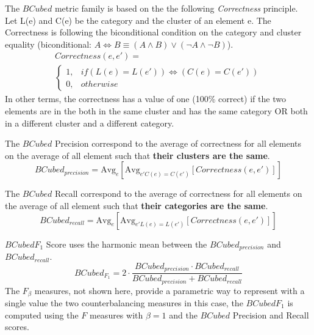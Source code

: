 \begin{definition}
  The $BCubed$ metric family is based on the the following \textit{Correctness} principle.
  Let L(e) and C(e) be the category and the cluster of an element e.
  The Correctness is following the biconditional condition on the category and cluster equality (biconditional: $A \Longleftrightarrow B \equiv (A \land B) \lor (\neg A \land \neg B)$).
  \begin{gather*}
    Correctness(e, e') = \\
    \begin{cases}
      1, & if (L(e) = L(e')) \Longleftrightarrow (C(e) = C(e'))\\
      0, & otherwise
    \end{cases}
  \end{gather*}
  In other terms, the correctness has a value of one (100\% correct) if the two elements are in the both in the same cluster and has the same category OR both in a different cluster and a different category.
\end{definition}

\begin{definition}
  The $BCubed$ Precision correspond to the average of correctness for all elements on the average of all element such that \textbf{their clusters are the same}.
  \begin{equation}
    BCubed_{precision} = \text{Avg}_{e}[\text{Avg}_{e' C(e)=C(e')}[Correctness(e, e')]]
  \end{equation}
\end{definition}

\begin{definition}
  The $BCubed$ Recall correspond to the average of correctness for all elements on the average of all element such that \textbf{their categories are the same}.
  \begin{equation}
    BCubed_{recall} = \text{Avg}_{e}[\text{Avg}_{e' L(e)=L(e')}[Correctness(e, e')]]
  \end{equation}
\end{definition}

\begin{definition}
  $BCubed F_1$ Score uses the harmonic mean between the $BCubed_{precision}$ and $BCubed_{recall}$.
  \begin{equation}
    BCubed_{F_1} =
    2 \cdot \frac{BCubed_{precision} \cdot BCubed_{recall}}
    {BCubed_{precision} + BCubed_{recall}}
  \end{equation}
  The $F_\beta$ measures, not shown here, provide a parametric way to represent with a single value the two counterbalancing measures in this case, the $BCubed F_1$ is computed using the $F$ measures with $\beta = 1$ and the $BCubed$ Precision and Recall scores.
\end{definition}

